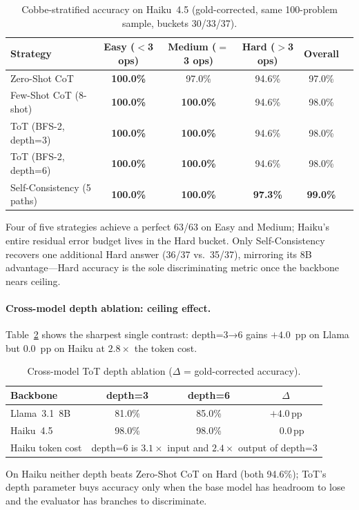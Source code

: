 ﻿\documentclass[runningheads]{llncs}
\begin{document}
\begin{table}[H]
\centering
\caption{Cobbe-stratified accuracy on Haiku~4.5
(gold-corrected, same 100-problem sample, buckets 30/33/37).}
\label{tab:crossmodel:strat}
\begin{tabular}{@{}lccccc@{}}
\toprule
\textbf{Strategy} &
\textbf{Easy ($<$3 ops)} &
\textbf{Medium ($=$3 ops)} &
\textbf{Hard ($>$3 ops)} &
\textbf{Overall} \\
\midrule
Zero-Shot CoT             & \textbf{100.0\%} & 97.0\%  & 94.6\%          & 97.0\% \\
Few-Shot CoT (8-shot)     & \textbf{100.0\%} & \textbf{100.0\%} & 94.6\%          & 98.0\% \\
ToT (BFS-2, depth=3)      & \textbf{100.0\%} & \textbf{100.0\%} & 94.6\%          & 98.0\% \\
ToT (BFS-2, depth=6)      & \textbf{100.0\%} & \textbf{100.0\%} & 94.6\%          & 98.0\% \\
Self-Consistency (5 paths)& \textbf{100.0\%} & \textbf{100.0\%} & \textbf{97.3\%} & \textbf{99.0\%} \\
\bottomrule
\end{tabular}
\end{table}

Four of five strategies achieve a perfect 63/63 on Easy and Medium;
Haiku's entire residual error budget lives in the Hard bucket.
Only Self-Consistency recovers one additional Hard answer (36/37 vs.\
35/37), mirroring its 8B advantage---Hard accuracy is the sole
discriminating metric once the backbone nears ceiling.

\paragraph{Cross-model depth ablation: ceiling effect.}
Table~\ref{tab:crossmodel:depth} shows the sharpest single contrast:
depth=3→6 gains $+4.0$~pp on Llama but $0.0$~pp on Haiku at
$2.8\times$ the token cost.
\begin{table}[H]
\centering
\caption{Cross-model ToT depth ablation ($\Delta$ = gold-corrected accuracy).}
\label{tab:crossmodel:depth}
\begin{tabular}{@{}lccc@{}}
\toprule
\textbf{Backbone} &
\textbf{depth=3} & \textbf{depth=6} & \boldmath$\Delta$ \\
\midrule
Llama~3.1~8B   & 81.0\% & 85.0\% & $+4.0$\,pp \\
Haiku~4.5      & 98.0\% & 98.0\% & $\phantom{+}0.0$\,pp \\
\midrule
Haiku token cost &
\multicolumn{3}{r}{depth=6 is $3.1\times$ input and $2.4\times$ output of depth=3} \\
\bottomrule
\end{tabular}
\end{table}
On Haiku neither depth beats Zero-Shot CoT on Hard (both 94.6\%);
ToT's depth parameter buys accuracy only when the base model has
headroom to lose and the evaluator has branches to discriminate.
\end{document}
